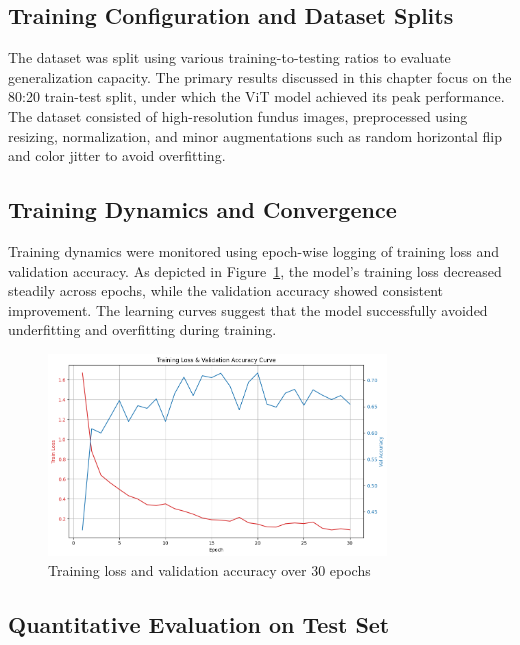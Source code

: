\documentclass[a4paper,12pt]{report}
\begin{document}
\subsection{Training Configuration and Dataset Splits}

The dataset was split using various training-to-testing ratios to evaluate generalization capacity. The primary results discussed in this chapter focus on the 80:20 train-test split, under which the ViT model achieved its peak performance. The dataset consisted of high-resolution fundus images, preprocessed using resizing, normalization, and minor augmentations such as random horizontal flip and color jitter to avoid overfitting.

\subsection{Training Dynamics and Convergence}

Training dynamics were monitored using epoch-wise logging of training loss and validation accuracy. As depicted in Figure~\ref{fig:loss_acc_curve}, the model's training loss decreased steadily across epochs, while the validation accuracy showed consistent improvement. The learning curves suggest that the model successfully avoided underfitting and overfitting during training.

\begin{figure}[h]
    \centering
    \includegraphics[width=0.8\textwidth]{loss_accuracy_curve.png}
    \caption{Training loss and validation accuracy over 30 epochs}
    \label{fig:loss_acc_curve}
\end{figure}

\subsection{Quantitative Evaluation on Test Set}
\end{document}
